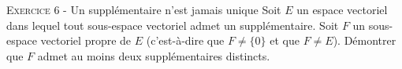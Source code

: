 

\vskip0.3cm\noindent\textsc{Exercice 6} - Un supplémentaire n'est jamais unique
\vskip0.2cm
Soit $E$ un espace vectoriel dans lequel tout sous-espace vectoriel admet un supplémentaire. Soit $F$ un sous-espace vectoriel propre de $E$ (c'est-à-dire que $F\neq \{0\}$ et que $F\neq E$). Démontrer que $F$ admet au moins deux supplémentaires distincts.




\vskip0.5cm

